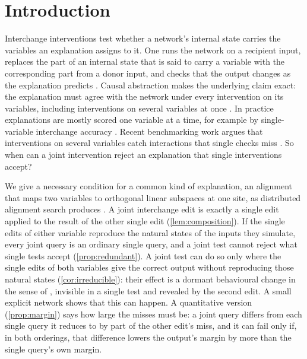 \section{Introduction}\label{sec:intro}

Interchange interventions test whether a network's internal state carries the variables an explanation assigns to
it. One runs the network on a recipient input, replaces the part of an internal state that is said to carry a
variable with the corresponding part from a donor input, and checks that the output changes as the explanation
predicts \citep{vig2020gender,geiger2021causal,wang2023ioi}. Causal abstraction makes the underlying claim exact:
the explanation must agree with the network under every intervention on its variables, including interventions on
several variables at once \citep{beckers2019abstracting,geiger2025abstraction}. In practice explanations are
mostly scored one variable at a time, for example by single-variable interchange accuracy
\citep{huang2024ravel,mueller2025mib}. Recent benchmarking work argues that interventions on several variables
catch interactions that single checks miss \citep{meloux2026validating}. So when can a joint intervention reject
an explanation that single interventions accept?

We give a necessary condition for a common kind of explanation, an alignment that maps two variables to orthogonal
linear subspaces at one site, as distributed alignment search produces \citep{geiger2024das}. A joint interchange
edit is exactly a single edit applied to the result of the other single edit (\cref{lem:composition}). If the
single edits of either variable reproduce the natural states of the inputs they simulate, every joint query is an
ordinary single query, and a joint test cannot reject what single tests accept (\cref{prop:redundant}). A joint test
can do so only where the single edits of both variables give the correct output without reproducing those natural
states (\cref{cor:irreducible}): their effect is a dormant behavioural change in the sense of
\citet{grant2026divergent}, invisible in a single test and revealed by the second edit. A small explicit network
shows that this can happen. A quantitative version (\cref{prop:margin}) says how large the misses must be: a joint
query differs from each single query it reduces to by part of the other edit's miss, and it can fail only if, in both
orderings, that difference lowers the output's margin by more than the single query's own margin.

